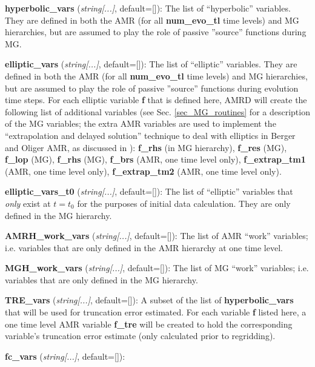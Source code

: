 \documentclass[aps,amssymb,unsortedaddress,nofootinbib]{revtex4}
\def\lsep{\itemsep 0.05in}
\begin{document}
\begin{list}{}{\lsep}
\item {\bf hyperbolic\_vars} ({\em string[...]}, default=[]):
      The list of ``hyperbolic'' variables. They are defined in both the
      AMR (for all {\bf num\_evo\_tl} time levels) and MG hierarchies, but
      are assumed to play the role of passive ''source'' functions during MG.
\item {\bf elliptic\_vars} ({\em string[...]}, default=[]):
      The list of ``elliptic'' variables. They are defined in both the
      AMR (for all {\bf num\_evo\_tl} time levels) and MG hierarchies,
      but are assumed to play the role of passive ''source'' functions during
      evolution time steps. For each elliptic variable {\bf f} that is
      defined here, AMRD will create the following list of additional 
      variables (see Sec. \ref{sec_MG_routines} for a description of
      the MG variables; the extra AMR variables are used to implement the
      ``extrapolation and delayed solution'' technique to deal with elliptics
      in Berger and Oliger AMR, as discussed in \cite{fpthesis}): 
      {\bf f\_rhs} (in MG hierarchy), {\bf f\_res} (MG), 
      {\bf f\_lop} (MG), {\bf f\_rhs} (MG), {\bf f\_brs} (AMR, one time level only),
      {\bf f\_extrap\_tm1} (AMR, one time level only),
      {\bf f\_extrap\_tm2} (AMR, one time level only).
\item {\bf elliptic\_vars\_t0} ({\em string[...]}, default=[]):
      The list of ``elliptic'' variables that {\em only} exist at $t=t_0$ for
      the purposes of initial data calculation. They are only defined in
      the MG hierarchy.
\item {\bf AMRH\_work\_vars} ({\em string[...]}, default=[]):
      The list of AMR ``work'' variables; i.e. variables that are only defined
      in the AMR hierarchy at one time level.
\item {\bf MGH\_work\_vars} ({\em string[...]}, default=[]):
      The list of MG ``work'' variables; i.e. variables that are only defined
      in the MG hierarchy.
\item {\bf TRE\_vars} ({\em string[...]}, default=[]):
      A subset of the list of {\bf hyperbolic\_vars} that will be used for
      truncation error estimated. For each variable {\bf f} listed here,
      a one time level AMR variable {\bf f\_tre} will be created to hold the
      corresponding variable's truncation error estimate (only calculated prior
      to regridding).
\item {\bf fc\_vars} ({\em string[...]}, default=[]):

\end{list}
\end{document}
